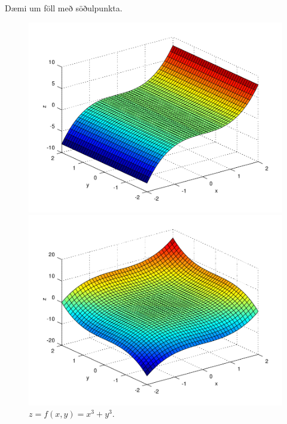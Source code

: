 \begin {frame}
Dæmi um föll með söðulpunkta.
   \begin{figure}[!h]
        \centering
        \begin{minipage}{.5\textwidth}
            \centering
            \includegraphics[width=.9\linewidth]{sodull1.png}
            \caption*{$z = f(x,y) = x^3$.}
        \end{minipage}%
        \begin{minipage}{.5\textwidth}
            \centering
            \includegraphics[width=.9\linewidth]{sodull2.png}
            \caption*{$z = f(x,y) = x^3+y^3$.}
        \end{minipage}
        
    \end{figure}
\end {frame}


